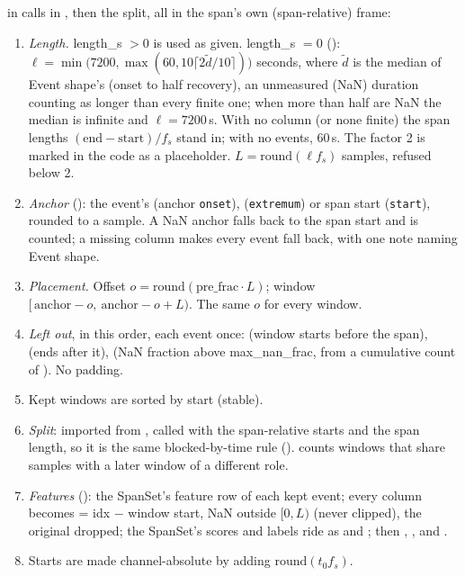  in  calls  in
, then the split, all in the span's own (span-relative)
frame:
\begin{enumerate}
\item \emph{Length.} length\_s $> 0$ is used as given. length\_s $= 0$ ():
  $\ell = \min\!\big(7200, \max(60, 10\lceil 2\tilde d/10\rceil)\big)$ seconds, where $\tilde d$ is
  the median of Event shape's  (onset to half recovery), an unmeasured (NaN)
  duration counting as longer than every finite one; when more than half are NaN the median is
  infinite and $\ell = 7200$\,s. With no  column (or none finite) the span lengths
  $(\text{end}-\text{start})/f_s$ stand in; with no events, 60\,s. The factor 2 is marked in the
  code as a placeholder. $L = \mathrm{round}(\ell f_s)$ samples, refused below 2.
\item \emph{Anchor} (): the event's  (anchor \texttt{onset}),
   (\texttt{extremum}) or span start (\texttt{start}), rounded to a sample. A
  NaN anchor falls back to the span start and is counted; a missing column makes every event fall
  back, with one note naming Event shape.
\item \emph{Placement.} Offset $o = \mathrm{round}(\text{pre\_frac}\cdot L)$; window
  $[\,\text{anchor} - o,\ \text{anchor} - o + L)$. The same $o$ for every window.
\item \emph{Left out}, in this order, each event once:  (window starts before
  the span),  (ends after it),  (NaN fraction above
  max\_nan\_frac, from a cumulative count of ). No padding.
\item Kept windows are sorted by start (stable).
\item \emph{Split}:  imported from
  , called with the span-relative starts and the
  span length, so it is the same blocked-by-time rule ().
   counts windows that share samples with a later window of a different role.
\item \emph{Features} (): the SpanSet's feature row of each kept event; every
   column becomes  = idx $-$ window start, NaN outside
  $[0, L)$ (never clipped), the original dropped; the SpanSet's scores and labels ride as
   and ; then , ,
   and .
\item Starts are made channel-absolute by adding $\mathrm{round}(t_0 f_s)$.
\end{enumerate}

